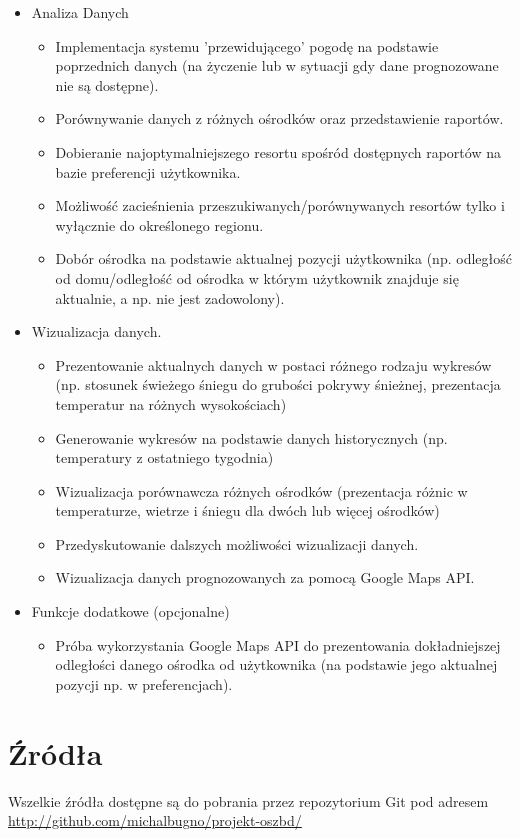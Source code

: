 \documentclass[12pt]{article}
\begin{document}
\begin{itemize}
\item Analiza Danych
  \begin{itemize}
  \item Implementacja systemu 'przewidującego' pogodę na podstawie poprzednich danych (na życzenie lub w sytuacji gdy dane prognozowane nie są dostępne).
  \item Porównywanie danych z różnych ośrodków oraz przedstawienie raportów.
  \item Dobieranie najoptymalniejszego resortu spośród dostępnych raportów na bazie preferencji użytkownika.
  \item Możliwość zacieśnienia przeszukiwanych/porównywanych resortów tylko i wyłącznie do określonego regionu.
  \item Dobór ośrodka na podstawie aktualnej pozycji użytkownika (np. odległość od domu/odległość od ośrodka w którym użytkownik znajduje się aktualnie, a np. nie jest zadowolony).
  \end{itemize}

\item Wizualizacja danych.
  \begin{itemize}
  \item Prezentowanie aktualnych danych w postaci różnego rodzaju wykresów (np. stosunek świeżego śniegu do grubości pokrywy śnieżnej, prezentacja temperatur na różnych wysokościach)
  \item Generowanie wykresów na podstawie danych historycznych (np. temperatury z ostatniego tygodnia)
  \item Wizualizacja porównawcza różnych ośrodków (prezentacja różnic w temperaturze, wietrze i śniegu dla dwóch lub więcej ośrodków)
  \item Przedyskutowanie dalszych możliwości wizualizacji danych.
  \item Wizualizacja danych prognozowanych za pomocą Google Maps API.
  \end{itemize}

\item Funkcje dodatkowe (opcjonalne)
  \begin{itemize}
  \item Próba wykorzystania Google Maps API do prezentowania dokładniejszej odległości danego ośrodka od użytkownika (na podstawie jego aktualnej pozycji np. w preferencjach).
  \end{itemize}

\end{itemize}

\section{Źródła}
Wszelkie źródła dostępne są do pobrania przez repozytorium Git pod adresem
\\
\url{http://github.com/michalbugno/projekt-oszbd/}
\end{document}
